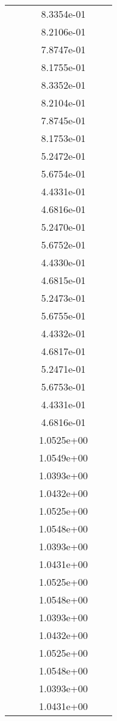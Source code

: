 \begin{xltabular}{\textwidth}{r|rS[table-format=1.3e+2]S[table-format=1.4e+2]S[table-format=1.4e+2]S[table-format=-1.5]}
&  &  & 8.3354e-01 & & \\
&  &  & 8.2106e-01 & & \\
&  &  & 7.8747e-01 & & \\
&  &  & 8.1755e-01 & & \\
&  &  & 8.3352e-01 & & \\
&  &  & 8.2104e-01 & & \\
&  &  & 7.8745e-01 & & \\
&  &  & 8.1753e-01 & & \\
&  &  & 5.2472e-01 & & \\
&  &  & 5.6754e-01 & & \\
&  &  & 4.4331e-01 & & \\
&  &  & 4.6816e-01 & & \\
&  &  & 5.2470e-01 & & \\
&  &  & 5.6752e-01 & & \\
&  &  & 4.4330e-01 & & \\
&  &  & 4.6815e-01 & & \\
&  &  & 5.2473e-01 & & \\
&  &  & 5.6755e-01 & & \\
&  &  & 4.4332e-01 & & \\
&  &  & 4.6817e-01 & & \\
&  &  & 5.2471e-01 & & \\
&  &  & 5.6753e-01 & & \\
&  &  & 4.4331e-01 & & \\
&  &  & 4.6816e-01 & & \\
&  &  & 1.0525e+00 & & \\
&  &  & 1.0549e+00 & & \\
&  &  & 1.0393e+00 & & \\
&  &  & 1.0432e+00 & & \\
&  &  & 1.0525e+00 & & \\
&  &  & 1.0548e+00 & & \\
&  &  & 1.0393e+00 & & \\
&  &  & 1.0431e+00 & & \\
&  &  & 1.0525e+00 & & \\
&  &  & 1.0548e+00 & & \\
&  &  & 1.0393e+00 & & \\
&  &  & 1.0432e+00 & & \\
&  &  & 1.0525e+00 & & \\
&  &  & 1.0548e+00 & & \\
&  &  & 1.0393e+00 & & \\
&  &  & 1.0431e+00 & & \\

\end{xltabular}
